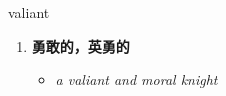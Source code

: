 
\begin{frame}
{\huge valiant}
\begin{center}
\begin{enumerate}\Large
  \item \textbf{勇敢的，英勇的}
  \begin{itemize}
    \item \em{\Large{a valiant and moral knight}}
  \end{itemize}
\end{enumerate}
\end{center}
\end{frame}
